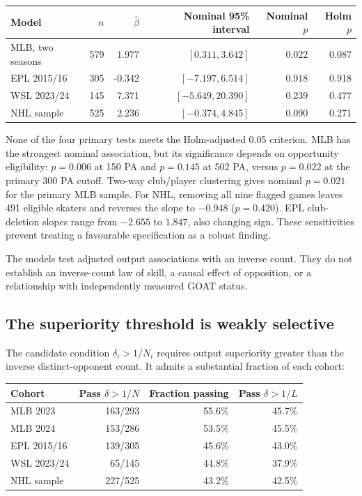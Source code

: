\documentclass[11pt,letterpaper]{article}
\begin{document}
\begin{center}
\small
\begin{tabular}{@{}lrrrrr@{}}
\toprule
Model & $n$ & $\widehat\beta$ & Nominal 95\% interval & Nominal $p$ & Holm $p$ \\
\midrule
MLB, two seasons & 579 & 1.977 & $[0.311,3.642]$ & 0.022 & 0.087 \\
EPL 2015/16 & 305 & -0.342 & $[-7.197,6.514]$ & 0.918 & 0.918 \\
WSL 2023/24 & 145 & 7.371 & $[-5.649,20.390]$ & 0.239 & 0.477 \\
NHL sample & 525 & 2.236 & $[-0.374,4.845]$ & 0.090 & 0.271 \\
\bottomrule
\end{tabular}
\end{center}

None of the four primary tests meets the Holm-adjusted 0.05 criterion.
MLB has the strongest nominal association, but its significance depends on opportunity eligibility: $p=0.006$ at 150 PA and $p=0.145$ at 502 PA, versus $p=0.022$ at the primary 300 PA cutoff.
Two-way club/player clustering gives nominal $p=0.021$ for the primary MLB sample.
For NHL, removing all nine flagged games leaves 491 eligible skaters and reverses the slope to $-0.948$ ($p=0.420$).
EPL club-deletion slopes range from $-2.655$ to $1.847$, also changing sign.
These sensitivities prevent treating a favourable specification as a robust finding.

The models test adjusted output associations with an inverse count.
They do not establish an inverse-count law of skill, a causal effect of opposition, or a relationship with independently measured GOAT status.

\subsection{The superiority threshold is weakly selective}

The candidate condition $\delta_i>1/N_i$ requires output superiority greater than the inverse distinct-opponent count.
It admits a substantial fraction of each cohort:

\begin{center}
\small
\begin{tabular}{@{}lrrr@{}}
\toprule
Cohort & Pass $\delta>1/N$ & Fraction passing & Pass $\delta>1/L$ \\
\midrule
MLB 2023 & 163/293 & 55.6\% & 45.7\% \\
MLB 2024 & 153/286 & 53.5\% & 45.5\% \\
EPL 2015/16 & 139/305 & 45.6\% & 43.0\% \\
WSL 2023/24 & 65/145 & 44.8\% & 37.9\% \\
NHL sample & 227/525 & 43.2\% & 42.5\% \\
\bottomrule
\end{tabular}
\end{center}
\end{document}
